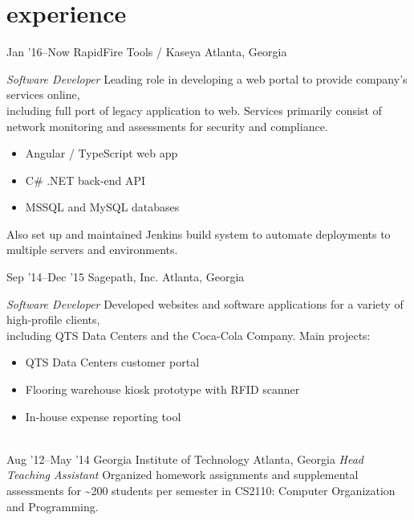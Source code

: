 \documentclass[print]{friggeri-cv} %
\begin{document}

\section{experience}

\begin{entrylist}
\entry
{Jan '16--Now}
{RapidFire Tools / Kaseya}
{Atlanta, Georgia}
{\emph{Software Developer}
\smallbreak
Leading role in developing a web portal to provide company's services online, \\
including full port of legacy application to web. Services primarily consist of \\
network monitoring and assessments for security and compliance.
\smallbreak
\begin{itemize}
\item Angular / TypeScript web app
\item C\# .NET back-end API
\item MSSQL and MySQL databases
\end{itemize}
\smallbreak
Also set up and maintained Jenkins build system to automate deployments to \\
multiple servers and environments.
\smallbreak }
\entry
{Sep '14--Dec '15}
{Sagepath, Inc.}
{Atlanta, Georgia}
{\emph{Software Developer}
\smallbreak
Developed websites and software applications for a variety of high-profile clients, \\including QTS Data Centers and the Coca-Cola Company.
\smallbreak
Main projects:
\begin{itemize}
\item QTS Data Centers customer portal
\item Flooring warehouse kiosk prototype with RFID scanner
\item In-house expense reporting tool
\end{itemize}}
\\
\entry
{Aug '12--May '14}
{Georgia Institute of Technology}
{Atlanta, Georgia}
{\emph{Head Teaching Assistant}
\smallbreak
Organized homework assignments and supplemental assessments for \textasciitilde200 students per semester in CS2110: Computer Organization and Programming. }
\end{entrylist}
\end{document}
